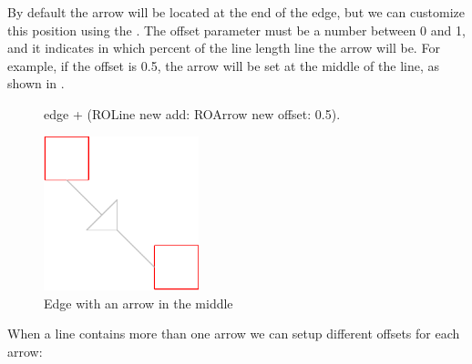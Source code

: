 \documentclass[a4paper,10pt,twoside]{book}
\begin{document}
By default the arrow will be located at the end of the edge, but we can customize this position using the . The offset parameter must be a number between 0 and 1, and it indicates in which percent of the line length line the arrow will be. For example, if the offset is 0.5, the arrow will be set at the middle of the line, as shown in .

\begin{figure}[H]
      \begin{minipage}[t]{0.5\textwidth}
      \vspace{0pt}
     \begin{code}{}
edge + (ROLine new add: ROArrow new offset: 0.5). \end{code}
   \end{minipage}
   \hfill
   \begin{minipage}[t]{0.4\textwidth}
      \vspace{0pt} \raggedright
       \centering
		\includegraphics[width=0.4\textwidth]{arrowMiddleEdge}
   \end{minipage}
\caption{Edge with an arrow in the middle}
\label{fig:arrowMiddleEdge}
\end{figure} 

When a line contains more than one arrow we can setup different offsets for each arrow:
\end{document}
